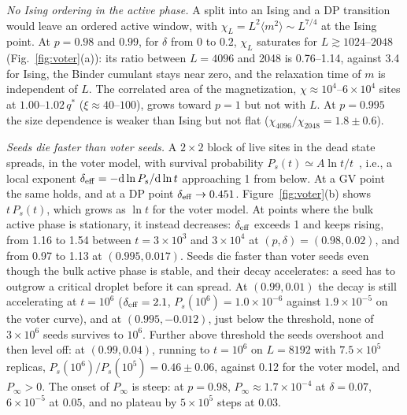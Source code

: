 \documentclass[pre,twocolumn,superscriptaddress,showpacs,floatfix]{revtex4-2}
\newcommand{\qs}{q^{*}}
\newcommand{\ds}{\mathrm{d}}
\begin{document}
\textit{No Ising ordering in the active phase.} A split into an Ising and a DP transition would
leave an ordered active window, with $\chi_L = L^2\langle m^2\rangle\sim L^{7/4}$ at the Ising
point. At $p = 0.98$ and $0.99$, for $\delta$ from $0$ to $0.2$, $\chi_L$ saturates for $L\gtrsim
1024$--$2048$ (Fig.~\ref{fig:voter}(a)): its ratio between $L = 4096$ and 2048 is 0.76--1.14,
against 3.4 for Ising, the Binder cumulant stays near zero, and the relaxation time of $m$ is
independent of $L$. The correlated area of the magnetization, $\chi\approx 10^4$--$6\times10^4$
sites at $1.00$--$1.02\,\qs$ ($\xi\approx 40$--$100$), grows toward $p = 1$ but not with $L$. At
$p = 0.995$ the
size dependence is weaker than Ising but not flat ($\chi_{4096}/\chi_{2048} = 1.8\pm0.6$).

\textit{Seeds die faster than voter seeds.} A $2\times2$ block of live sites in the dead state
spreads, in the voter model, with survival probability $P_s(t)\simeq A\ln t/t$~\cite{bramson1980},
i.e., a local exponent $\delta_{\rm eff} = -\ds\ln P_s/\ds\ln t$ approaching 1 from below. At a GV
point the same holds, and at a DP point $\delta_{\rm eff}\to 0.451$. Figure~\ref{fig:voter}(b)
shows $t\,P_s(t)$, which grows as $\ln t$ for the voter model. At points where the bulk active
phase is stationary, it instead decreases: $\delta_{\rm eff}$ exceeds 1 and keeps rising, from 1.16 to 1.54 between $t = 3\times10^3$ and $3\times10^4$ at $(p,\delta) =
(0.98, 0.02)$, and from 0.97 to 1.13 at $(0.995, 0.017)$. Seeds die faster than voter seeds even
though the bulk active phase is stable, and their decay accelerates: a seed has to outgrow a
critical droplet before it can spread. At $(0.99, 0.01)$ the decay is still accelerating at
$t = 10^6$ ($\delta_{\rm eff} = 2.1$, $P_s(10^6) = 1.0\times10^{-6}$ against $1.9\times10^{-5}$ on the
voter curve), and at $(0.995, -0.012)$, just below the threshold, none of
$3\times10^6$ seeds survives to $10^6$. Further above threshold the seeds overshoot and then level off: at $(0.99, 0.04)$, running to
$t = 10^6$ on $L = 8192$ with $7.5\times10^5$ replicas, $P_s(10^6)/P_s(10^5) = 0.46\pm0.06$,
against 0.12 for the voter model, and $P_\infty>0$. The onset of $P_\infty$ is steep: at
$p = 0.98$, $P_\infty\approx 1.7\times10^{-4}$ at $\delta = 0.07$, $6\times10^{-5}$ at $0.05$, and no
plateau by $5\times10^5$ steps at $0.03$.
\end{document}
